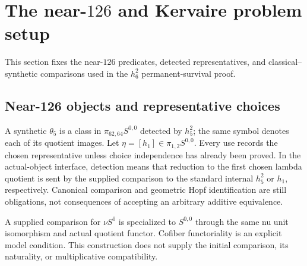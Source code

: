 \section{The near-$126$ and Kervaire problem setup}
\label{chap:kervaire-setup}

This section fixes the near-$126$ predicates, detected representatives, and
classical--synthetic comparisons used in the $h_6^2$ permanent-survival proof.

\subsection{Near-126 objects and representative choices}

\begin{definition}
  \label{def:synthetic-theta5-choice}
  \notready
  A synthetic $\theta_5$ is a class in
  $\pi_{62,64}S^{0,0}$ detected by $h_5^2$; the same symbol denotes each of its
  quotient images.  Let $\eta=[h_1]\in\pi_{1,2}S^{0,0}$.  Every use records
  the chosen representative unless choice independence has already been
  proved. In the actual-object interface, detection means that reduction to
  the first chosen lambda quotient is sent by the supplied comparison to the
  standard internal $h_5^2$ or $h_1$, respectively. Canonical comparison and
  geometric Hopf identification are still obligations, not consequences of
  accepting an arbitrary additive equivalence.
\end{definition}

\begin{definition}
  \label{def:actual-sphere-first-quotient}
  \notready
  A supplied comparison for $\nu S^0$ is specialized to $S^{0,0}$ through the
  same nu unit isomorphism and actual quotient functor. Cofiber functoriality
  is an explicit model condition. This construction does not supply the
  initial comparison, its naturality, or multiplicative compatibility.
\end{definition}

